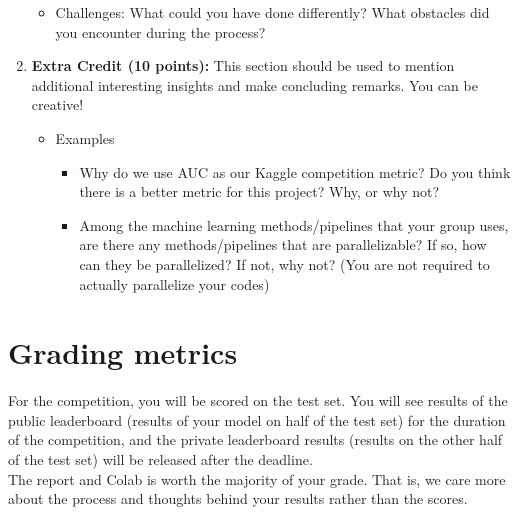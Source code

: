 \begin{enumerate}
\begin{itemize}
        \item Challenges: What could you have done differently? What obstacles did you encounter during the process?
    \end{itemize}
    \item \textbf{Extra Credit (10 points):} This section should be used to mention additional interesting insights and make concluding remarks. You can be creative!
        \begin{itemize}
            \item Examples
            \begin{itemize}
                \item Why do we use AUC as our Kaggle competition metric? Do you think there is a better metric for this project? Why, or why not?
                \item Among the machine learning methods/pipelines that your group uses, 
                are there any methods/pipelines that are parallelizable? If so, how can they be parallelized? If not, why not? (You are not required to actually parallelize  your codes)
            \end{itemize}
        \end{itemize}
\end{enumerate}

\section{Grading metrics}

\noindent For the competition, you will be scored on the test set. You will see results of the public leaderboard (results of your model on half of the test set) for the duration of the competition, and the private leaderboard results (results on the other half of the test set) will be released after the deadline.\\

\noindent The report and Colab is worth the majority of your grade. That is, we care more about the process and thoughts behind your results rather than the scores.
